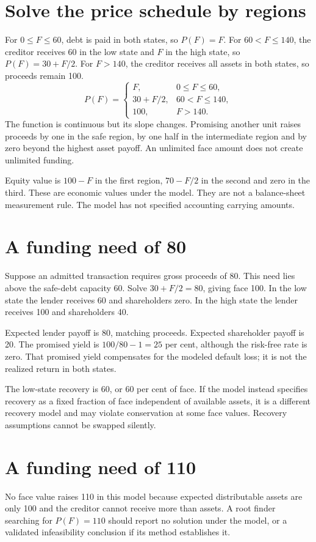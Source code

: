 \section{Solve the price schedule by regions}
For $0\leq F\leq60$, debt is paid in both states, so $P(F)=F$. For $60<F\leq140$, the creditor receives 60 in the low state and $F$ in the high state, so $P(F)=30+F/2$. For $F>140$, the creditor receives all assets in both states, so proceeds remain 100.
\begin{equation}
 P(F)=\begin{cases}
 F,&0\leq F\leq60,\\
 30+F/2,&60<F\leq140,\\
 100,&F>140.
 \end{cases}
 \label{sim:finite-price}
\end{equation}
The function is continuous but its slope changes. Promising another unit raises proceeds by one in the safe region, by one half in the intermediate region and by zero beyond the highest asset payoff. An unlimited face amount does not create unlimited funding.

Equity value is $100-F$ in the first region, $70-F/2$ in the second and zero in the third. These are economic values under the model. They are not a balance-sheet measurement rule. The model has not specified accounting carrying amounts.

\section{A funding need of 80}
Suppose an admitted transaction requires gross proceeds of 80. This need lies above the safe-debt capacity 60. Solve $30+F/2=80$, giving face 100. In the low state the lender receives 60 and shareholders zero. In the high state the lender receives 100 and shareholders 40.

Expected lender payoff is 80, matching proceeds. Expected shareholder payoff is 20. The promised yield is $100/80-1=25$ per cent, although the risk-free rate is zero. That promised yield compensates for the modeled default loss; it is not the realized return in both states.

The low-state recovery is 60, or 60 per cent of face. If the model instead specifies recovery as a fixed fraction of face independent of available assets, it is a different recovery model and may violate conservation at some face values. Recovery assumptions cannot be swapped silently.

\section{A funding need of 110}
No face value raises 110 in this model because expected distributable assets are only 100 and the creditor cannot receive more than assets. A root finder searching for $P(F)=110$ should report no solution under the model, or a validated infeasibility conclusion if its method establishes it.

